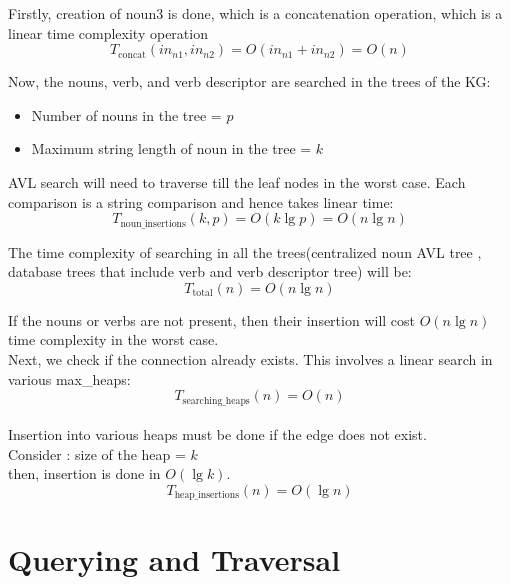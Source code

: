 \documentclass[conference]{IEEEtran}
\begin{document}
Firstly, creation of noun3 is done, which is a concatenation operation, which is a linear time complexity operation
\\
\begin{equation}
	T_{\text{concat}}(in_{n1}, in_{n2}) = O(in_{n1} + in_{n2}) = O(n)
\end{equation}

Now, the nouns, verb, and verb descriptor are searched in the trees of the KG:
\begin{itemize}
    \item Number of nouns in the tree = $p$
    \item Maximum string length of noun in the tree = $k$
\end{itemize}
AVL search will need to traverse till the leaf nodes in the worst case. Each comparison is a string comparison and hence takes linear time:
\begin{equation}
	T_{\text{noun\_insertions}}(k, p) = O(k \lg p) = O(n \lg n)
\end{equation}


The time complexity of searching in all the trees(centralized noun AVL tree , database trees that include verb and verb descriptor tree) will be:
\begin{equation}
	T_{\text{total}}(n) = O(n \lg n)
\end{equation}

If the nouns or verbs are not present, then their insertion  will cost $O(n \lg n)$ time complexity in the worst case.
\\
Next, we check if the connection already exists. This involves a linear search in various max\_heaps:
\begin{equation}
	T_{\text{searching\_heaps}}(n) = O(n)
\end{equation}
\\
Insertion into various heaps must be done if the edge does not exist. \\Consider : size of the heap = $k$
\\then, insertion is done in $O(\lg k)$.
\\
\begin{equation}
	T_{\text{heap\_insertions}}(n) = O(\lg n)
\end{equation}



\section{Querying and Traversal}
\end{document}
